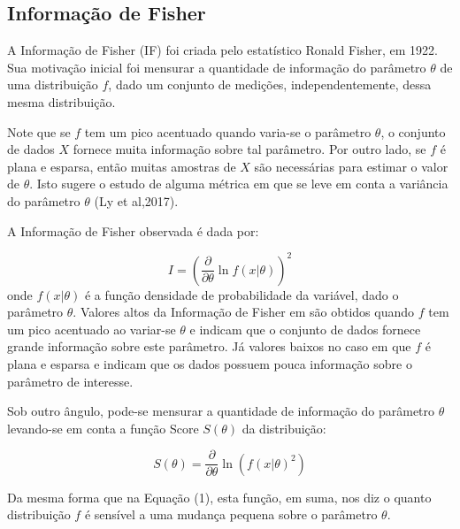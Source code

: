 \documentclass{article}[12pt]
\begin{document}
\subsection{Informação de Fisher}

A Informação de Fisher (IF) foi criada pelo estatístico Ronald Fisher, em 1922. Sua motivação inicial foi mensurar a quantidade de
informação do parâmetro $\theta$ de uma distribuição $f$, dado um conjunto de medições,
independentemente, dessa mesma distribuição. 

Note que se $f$ tem um pico acentuado quando varia-se o parâmetro $\theta$, o conjunto de dados $X$ fornece muita informação sobre tal parâmetro. Por outro lado, se $f$ é plana e esparsa, então muitas amostras de $X$ são necessárias para estimar o valor de $\theta$. Isto sugere o estudo de alguma métrica em que se leve em conta a variância do parâmetro $\theta$ (Ly et al,2017).

A Informação de Fisher observada é dada por: %

\begin{equation}
\label{eq1}
    I = \left(\frac{\partial }{\partial \theta } \ln f(x|\theta ) \right)^{2} 
\end{equation}
onde \(f(x|\theta )\) é a função densidade de probabilidade da variável, dado o parâmetro
\(\theta \). 
Valores altos da Informação de Fisher em \label{eq1} são obtidos quando $f$ tem um pico acentuado ao variar-se $\theta$ e indicam que o conjunto de dados fornece grande informação sobre este parâmetro. Já valores baixos no caso em que $f$ é plana e esparsa e indicam que os dados possuem pouca informação sobre o parâmetro de interesse.


Sob outro ângulo, pode-se mensurar a quantidade de informação do parâmetro $\theta$ levando-se em conta a função Score \(S(\theta )\) da distribuição:

\begin{equation}
\label{eq2}
S(\theta)=\frac{\partial}{\partial \theta} \ln (f(x| \theta )^{2})
\end{equation}


Da mesma forma que na Equação (1), esta função, em suma, nos diz o quanto distribuição $f$ é sensível a uma mudança pequena sobre o parâmetro \(\theta \). 
\end{document}
